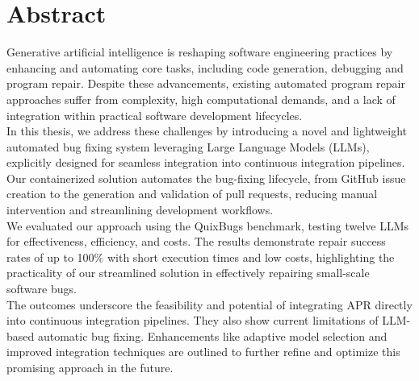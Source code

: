 \thispagestyle{empty}

\section*{Abstract}
Generative artificial intelligence is reshaping software engineering practices by enhancing and automating core tasks, including code generation, debugging and program repair. Despite these advancements, existing automated program repair approaches suffer from complexity, high computational demands, and a lack of integration within practical software development lifecycles.
\\
In this thesis, we address these challenges by introducing a novel and lightweight automated bug fixing system leveraging Large Language Models (LLMs), explicitly designed for seamless integration into continuous integration pipelines. Our containerized solution automates the bug-fixing lifecycle, from GitHub issue creation to the generation and validation of pull requests, reducing manual intervention and streamlining development workflows.\\
We evaluated our approach using the QuixBugs benchmark, testing twelve LLMs for effectiveness, efficiency, and costs. The results demonstrate repair success rates of up to 100\% with short execution times and low costs, highlighting the practicality of our streamlined solution in effectively repairing small-scale software bugs.
\\
The outcomes underscore the feasibility and potential of integrating APR directly into continuous integration pipelines. They also show current limitations of LLM-based automatic bug fixing. Enhancements like adaptive model selection and improved integration techniques are outlined to further refine and optimize this promising approach in the future.
